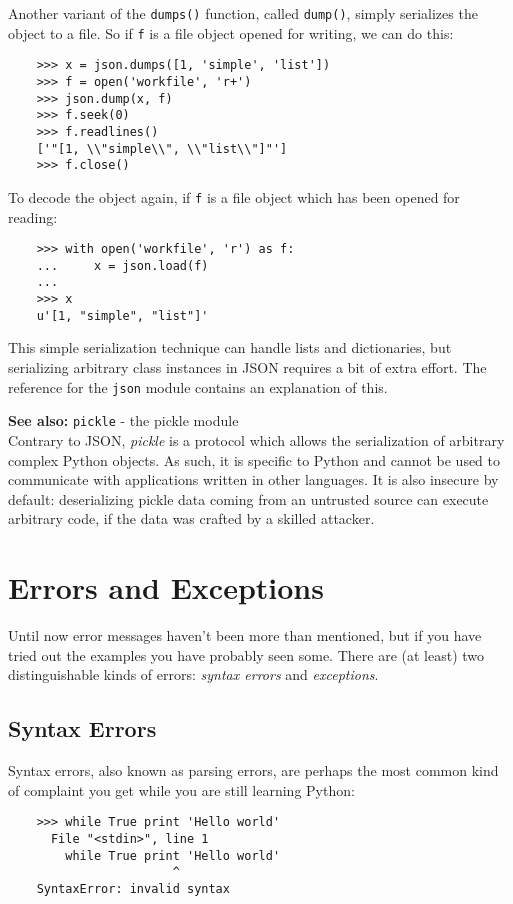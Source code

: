 \documentclass[UTF8]{article}
\begin{document}
Another variant of the \texttt{dumps()} function, called \texttt{dump()}, simply serializes the
object to a file. So if \texttt{f} is a file object opened for writing, we can do this:
\begin{verbatim}
    >>> x = json.dumps([1, 'simple', 'list'])
    >>> f = open('workfile', 'r+')
    >>> json.dump(x, f)
    >>> f.seek(0)
    >>> f.readlines()
    ['"[1, \\"simple\\", \\"list\\"]"']
    >>> f.close()
\end{verbatim}

To decode the object again, if \texttt{f} is a file object which has been opened for reading:
\begin{verbatim}
    >>> with open('workfile', 'r') as f:
    ...     x = json.load(f)
    ...
    >>> x
    u'[1, "simple", "list"]'
\end{verbatim}

This simple serialization technique can handle lists and dictionaries, but serializing arbitrary
class instances in JSON requires a bit of extra effort. The reference for the \texttt{json} module
contains an explanation of this.

\textbf{See also:} \texttt{pickle} - the pickle module \\
Contrary to JSON, \emph{pickle} is a protocol which allows the serialization of arbitrary complex
Python objects. As such, it is specific to Python and cannot be used to communicate with
applications written in other languages. It is also insecure by default: deserializing pickle data
coming from an untrusted source can execute arbitrary code, if the data was crafted by a skilled
attacker.

\section{Errors and Exceptions}
Until now error messages haven't been more than mentioned, but if you have tried out the examples
you have probably seen some. There are (at least) two distinguishable kinds of errors:
\emph{syntax errors} and \emph{exceptions}.

\subsection{Syntax Errors}
Syntax errors, also known as parsing errors, are perhaps the most common kind of complaint you get
while you are still learning Python:
\begin{verbatim}
    >>> while True print 'Hello world'
      File "<stdin>", line 1
        while True print 'Hello world'
                       ^
    SyntaxError: invalid syntax
\end{verbatim}
\end{document}
